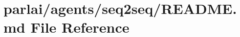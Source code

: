 \hypertarget{parlai_2agents_2seq2seq_2README_8md}{}\section{parlai/agents/seq2seq/\+R\+E\+A\+D\+ME.md File Reference}
\label{parlai_2agents_2seq2seq_2README_8md}
